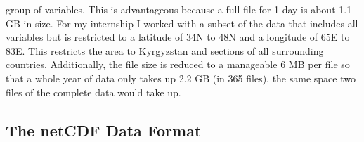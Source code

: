 \documentclass[../00_main.tex]{subfiles}
\begin{document}
group of variables. This is advantageous because a full file for 1 day is about
1.1 GB in size.
For my internship I worked with a subset of the data that includes all
variables but is restricted to a latitude of 34\textdegree{}N to
48\textdegree{}N and a longitude of 65\textdegree{}E to 83\textdegree{}E. This
restricts the area to Kyrgyzstan and sections of all surrounding countries.
Additionally, the file size is reduced to a manageable 6 MB per file so that
a whole year of data only takes up 2.2 GB (in 365 files), the same space two
files of the complete data would take up.

\subsection{The netCDF Data Format}
\end{document}
